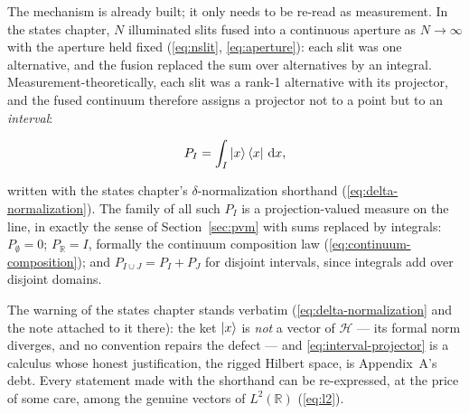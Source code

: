 The mechanism is already built; it only needs to be re-read as measurement. In the states chapter, $N$ illuminated slits fused into a continuous aperture as $N \to \infty$ with the aperture held fixed (\eqref{eq:nslit}, \eqref{eq:aperture}): each slit was one alternative, and the fusion replaced the sum over alternatives by an integral. Measurement-theoretically, each slit was a rank-1 alternative with its projector, and the fused continuum therefore assigns a projector not to a point but to an \emph{interval}:
\begin{linenomath}
    \begin{equation}
        P_I = \int_I \ket{x}\bra{x}\,\mathrm{d} x ,
        \label{eq:interval-projector}
    \end{equation}
\end{linenomath}
written with the states chapter's $\delta$-normalization shorthand (\eqref{eq:delta-normalization}). The family of all such $P_I$ is a projection-valued measure on the line, in exactly the sense of Section~\ref{sec:pvm} with sums replaced by integrals: $P_\emptyset = 0$; $P_{\mathbb{R}} = I$, formally the continuum composition law (\eqref{eq:continuum-composition}); and $P_{I \cup J} = P_I + P_J$ for disjoint intervals, since integrals add over disjoint domains.

\begin{note}
The warning of the states chapter stands verbatim (\eqref{eq:delta-normalization} and the note attached to it there): the ket $\ket{x}$ is \emph{not} a vector of $\mathcal{H}$ --- its formal norm diverges, and no convention repairs the defect --- and \eqref{eq:interval-projector} is a calculus whose honest justification, the rigged Hilbert space, is Appendix~A's debt. Every statement made with the shorthand can be re-expressed, at the price of some care, among the genuine vectors of $L^2(\mathbb{R})$ (\eqref{eq:l2}).
\end{note}

